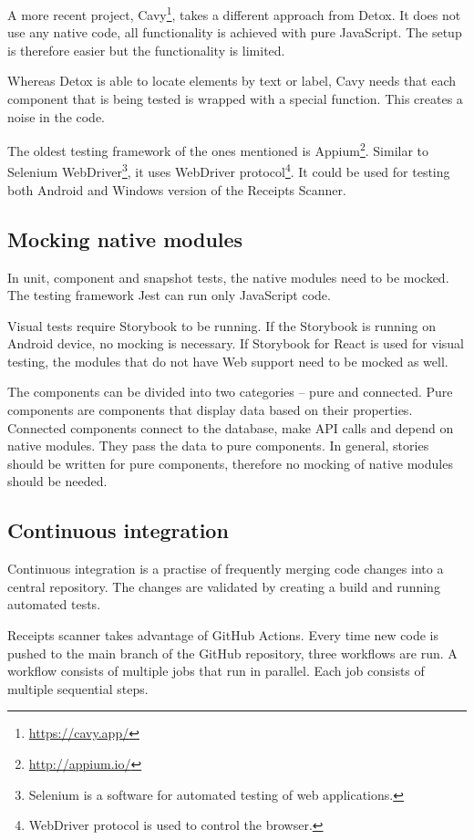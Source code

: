 \documentclass[
  digital, %
  table,   %
  oneside, %
  lof,     %
  lot,     %
]{fithesis3}
\begin{document}
A more recent project, Cavy\footnote{\url{https://cavy.app/}}, takes a different approach from Detox. It does not use any native code, all functionality is achieved with pure JavaScript. The setup is therefore easier but the functionality is limited. 

Whereas Detox is able to locate elements by text or label, Cavy needs that each component that is being tested is wrapped with a special function. This creates a noise in the code.

The oldest testing framework of the ones mentioned is Appium\footnote{\url{http://appium.io/}}. Similar to Selenium WebDriver\footnote{Selenium is a software for automated testing of web applications.}, it uses WebDriver protocol\footnote{WebDriver protocol is used to control the browser.}. It could be used for testing both Android and Windows version of the Receipts Scanner. 

\subsection{Mocking native modules}
In unit, component and snapshot tests, the native modules need to be mocked. The testing framework Jest can run only JavaScript code.

Visual tests require Storybook to be running. If the Storybook is running on Android device, no mocking is necessary. If Storybook for React is used for visual testing, the modules that do not have Web support need to be mocked as well.

The components can be divided into two categories -- pure and connected. Pure components are components that display data based on their properties. Connected components connect to the database, make API calls and depend on native modules. They pass the data to pure components. In general, stories should be written for pure components, therefore no mocking of native modules should be needed.

\subsection{Continuous integration}
Continuous integration is a practise of frequently merging code changes into a central repository. The changes are validated by creating a build and running automated tests. \cite{fowler2006}

Receipts scanner takes advantage of GitHub Actions. Every time new code is pushed to the main branch of the GitHub repository, three workflows are run. A workflow consists of multiple jobs that run in parallel. Each job consists of multiple sequential steps.
\end{document}
